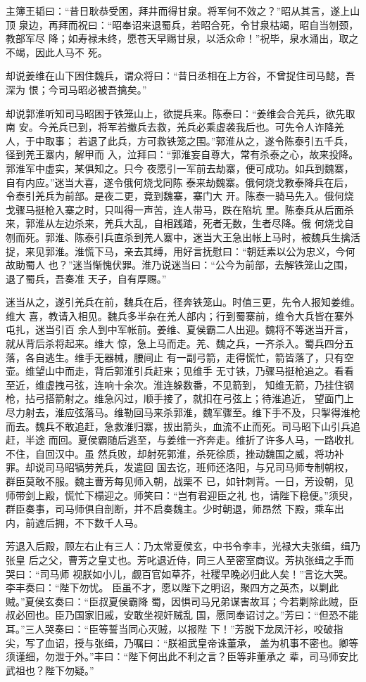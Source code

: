 主簿王韬曰：“昔日耿恭受困，拜井而得甘泉。将军何不效之？”昭从其言，遂上山顶
泉边，再拜而祝曰：“昭奉诏来退蜀兵，若昭合死，令甘泉枯竭，昭自当刎颈，教部军尽
降；如寿禄未终，愿苍天早赐甘泉，以活众命！”祝毕，泉水涌出，取之不竭，因此人马不
死。

却说姜维在山下困住魏兵，谓众将曰：“昔日丞相在上方谷，不曾捉住司马懿，吾深为
恨；今司马昭必被吾擒矣。”

却说郭淮听知司马昭困于铁笼山上，欲提兵来。陈泰曰：“姜维会合羌兵，欲先取南
安。今羌兵已到，将军若撤兵去救，羌兵必乘虚袭我后也。可先令人诈降羌人，于中取事；
若退了此兵，方可救铁笼之围。”郭淮从之，遂令陈泰引五千兵，径到羌王寨内，解甲而
入，泣拜曰：“郭淮妄自尊大，常有杀泰之心，故来投降。郭淮军中虚实，某俱知之。只今
夜愿引一军前去劫寨，便可成功。如兵到魏寨，自有内应。”迷当大喜，遂令俄何烧戈同陈
泰来劫魏寨。俄何烧戈教泰降兵在后，令泰引羌兵为前部。是夜二更，竟到魏寨，寨门大
开。陈泰一骑马先入。俄何烧戈骤马挺枪入寨之时，只叫得一声苦，连人带马，跌在陷坑
里。陈泰兵从后面杀来，郭淮从左边杀来，羌兵大乱，自相践踏，死者无数，生者尽降。俄
何烧戈自刎而死。郭淮、陈泰引兵直杀到羌人寨中，迷当大王急出帐上马时，被魏兵生擒活
捉，来见郭淮。淮慌下马，亲去其缚，用好言抚慰曰：“朝廷素以公为忠义，今何故助蜀人
也？”迷当惭愧伏罪。淮乃说迷当曰：“公今为前部，去解铁笼山之围，退了蜀兵，吾奏准
天子，自有厚赐。”

迷当从之，遂引羌兵在前，魏兵在后，径奔铁笼山。时值三更，先令人报知姜维。维大
喜，教请入相见。魏兵多半杂在羌人部内；行到蜀寨前，维令大兵皆在寨外屯扎，迷当引百
余人到中军帐前。姜维、夏侯霸二人出迎。魏将不等迷当开言，就从背后杀将起来。维大
惊，急上马而走。羌、魏之兵，一齐杀入。蜀兵四分五落，各自逃生。维手无器械，腰间止
有一副弓箭，走得慌忙，箭皆落了，只有空壶。维望山中而走，背后郭淮引兵赶来；见维手
无寸铁，乃骤马挺枪追之。看看至近，维虚拽弓弦，连响十余次。淮连躲数番，不见箭到，
知维无箭，乃挂住钢枪，拈弓搭箭射之。维急闪过，顺手接了，就扣在弓弦上；待淮追近，
望面门上尽力射去，淮应弦落马。维勒回马来杀郭淮，魏军骤至。维下手不及，只掣得淮枪
而去。魏兵不敢追赶，急救淮归寨，拔出箭头，血流不止而死。司马昭下山引兵追赶，半途
而回。夏侯霸随后逃至，与姜维一齐奔走。维折了许多人马，一路收扎不住，自回汉中。虽
然兵败，却射死郭淮，杀死徐质，挫动魏国之威，将功补罪。却说司马昭犒劳羌兵，发遣回
国去讫，班师还洛阳，与兄司马师专制朝权，群臣莫敢不服。魏主曹芳每见师入朝，战栗不
已，如针刺背。一日，芳设朝，见师带剑上殿，慌忙下榻迎之。师笑曰：“岂有君迎臣之礼
也，请陛下稳便。”须臾，群臣奏事，司马师俱自剖断，并不启奏魏主。少时朝退，师昂然
下殿，乘车出内，前遮后拥，不下数千人马。

芳退入后殿，顾左右止有三人：乃太常夏侯玄，中书令李丰，光禄大夫张缉，缉乃张皇
后之父，曹芳之皇丈也。芳叱退近侍，同三人至密室商议。芳执张缉之手而哭曰：“司马师
视朕如小儿，觑百官如草芥，社稷早晚必归此人矣！”言讫大哭。李丰奏曰：“陛下勿忧。
臣虽不才，愿以陛下之明诏，聚四方之英杰，以剿此贼。”夏侯玄奏曰：“臣叔夏侯霸降
蜀，因惧司马兄弟谋害故耳；今若剿除此贼，臣叔必回也。臣乃国家旧戚，安敢坐视奸贼乱
国，愿同奉诏讨之。”芳曰：“但恐不能耳。”三人哭奏曰：“臣等誓当同心灭贼，以报陛
下！”芳脱下龙凤汗衫，咬破指尖，写了血诏，授与张缉，乃嘱曰：“朕祖武皇帝诛董承，
盖为机事不密也。卿等须谨细，勿泄于外。”丰曰：“陛下何出此不利之言？臣等非董承之
辈，司马师安比武祖也？陛下勿疑。”

